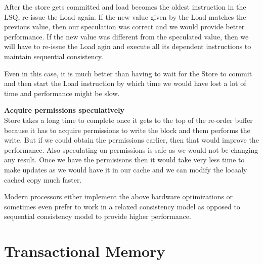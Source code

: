 \documentclass[11pt]{article}
\begin{document}
\begin{itemize}
	 After the store gets committed and load becomes the oldest instruction in the LSQ, re-issue the Load again. If the new value given by the Load matches the  previous value, then our speculation was correct and we would provide better performance. If the new value was different from the speculated value, then we will have to re-issue the Load agin and execute all its dependent instructions to maintain sequential consistency.
	 
	 Even in this case, it is much better than having to wait for the Store to commit and then start the Load instruction by which time we would have lost a lot of time and performance might be slow.

	\textbf{Acquire permissions speculatively}\\
	Store takes a long time to complete once it gets to the top of the re-order buffer because it has to acquire permissions to write the block and them performs the write. But if we could obtain the permissions earlier, then that would improve the performance. Also speculating on permissions is safe as we would not be changing any result. Once we have the permisisons then it would take very less time to make updates as we would have it in our cache and we can modify the locaaly cached copy much faster.
	
	Modern processors either implement the above hardware optimizations or sometimes even prefer to work in a relaxed consistency model as opposed to sequential consistency model to provide higher performance.
		
\end{itemize}

\section{Transactional Memory}
\end{document}
